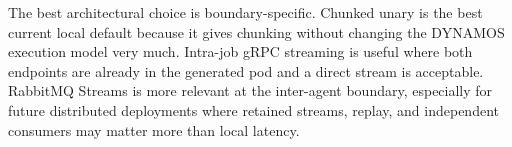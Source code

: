 The best architectural choice is boundary-specific. Chunked unary is the best current local default because it gives chunking without changing the DYNAMOS execution model very much. Intra-job gRPC streaming is useful where both endpoints are already in the generated pod and a direct stream is acceptable. RabbitMQ Streams is more relevant at the inter-agent boundary, especially for future distributed deployments where retained streams, replay, and independent consumers may matter more than local latency.
